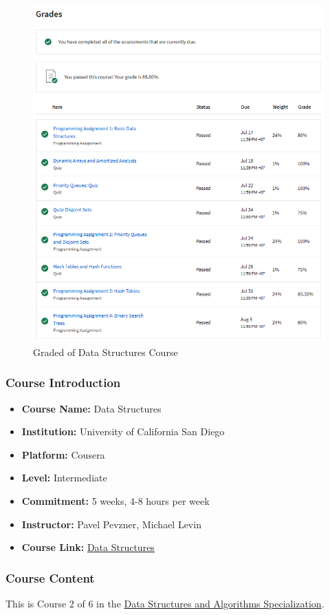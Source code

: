 \begin{figure}[H]
	\centering
	\includegraphics[width=0.65\linewidth]{img/Capture07.PNG}
	\caption{Graded of Data Structures Course}
	\label{fig:algorithmtoolbox}
\end{figure}

\subsubsection{Course Introduction}
\begin{itemize}
	\item \textbf{Course Name:} Data Structures
	\item \textbf{Institution:} University of California San Diego
	\item \textbf{Platform:} Cousera
	\item \textbf{Level: } Intermediate
	\item \textbf{Commitment:} 5 weeks, 4-8 hours per week
	\item \textbf{Instructor:} Pavel Pevzner, Michael Levin
	\item \textbf{Course Link:} \href{https://www.coursera.org/learn/data-structures}{Data Structures}
\end{itemize}
\subsubsection{Course Content}
This is Course 2 of 6 in the \href{https://www.coursera.org/specializations/data-structures-algorithms}{Data Structures and Algorithms Specialization}. \\


